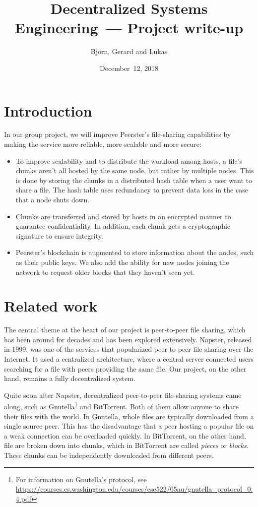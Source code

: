 \documentclass[12pt,a4paper,draft]{article}
\title{Decentralized Systems Engineering~--- Project write-up}
\author{Björn, Gerard and Lukas}
\date{December~12, 2018}
\begin{document}
\maketitle
\tableofcontents

\section{Introduction}

In our group project, we will improve Peerster's file-sharing capabilities by making the service more reliable, more scalable and more secure:

\begin{itemize}
    \item To improve scalability and to distribute the workload among hosts, a file's chunks aren't all hosted by the same node, but rather by multiple nodes.
    This is done by storing the chunks in a distributed hash table when a user want to share a file.
    The hash table uses redundancy to prevent data loss in the case that a node shuts down.
    \item Chunks are transferred and stored by hosts in an encrypted manner to guarantee confidentiality.
    In addition, each chunk gets a cryptographic signature to ensure integrity.
    \item Peerster's blockchain is augmented to store information about the nodes, such as their public keys.
    We also add the ability for new nodes joining the network to request older blocks that they haven't seen yet.
\end{itemize}

\section{Related work}

The central theme at the heart of our project is peer-to-peer file sharing, which has been around for decades and has been explored extensively.
Napster, released in 1999, was one of the services that popularized peer-to-peer file sharing over the Internet.
It used a centralized architecture, where a central server connected users searching for a file with peers providing the same file.
Our project, on the other hand, remains a fully decentralized system.

Quite soon after Napster, decentralized peer-to-peer file-sharing systems came along, such as Gnutella\footnote{For information on Gnutella's protocol, see \url{https://courses.cs.washington.edu/courses/cse522/05au/gnutella\_protocol\_0.4.pdf}} and BitTorrent.
Both of them allow anyone to share their files with the world.
In Gnutella, whole files are typically downloaded from a single source peer.
This has the disadvantage that a peer hosting a popular file on a weak connection can be overloaded quickly.
In BitTorrent, on the other hand, file are broken down into chunks, which in BitTorrent are called \emph{pieces} or \emph{blocks}.
These chunks can be independently downloaded from different peers.
\end{document}
